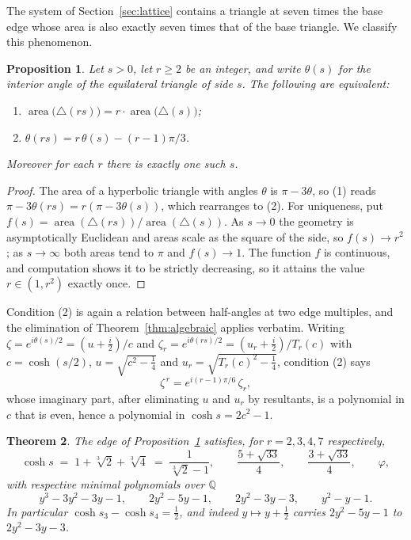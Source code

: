 \documentclass[11pt,a4paper]{article}
\theoremstyle{plain}
\newtheorem{theorem}{Theorem}[section]
\newtheorem{proposition}[theorem]{Proposition}
\theoremstyle{definition}
\theoremstyle{remark}
\newcommand{\QQ}{\mathbb{Q}}
\DeclareMathOperator{\area}{area}
\begin{document}
The system of Section~\ref{sec:lattice} contains a triangle at seven times the
base edge whose area is also exactly seven times that of the base triangle. We
classify this phenomenon.

\begin{proposition}\label{prop:rcond}
Let $s>0$, let $r\ge2$ be an integer, and write $\theta(s)$ for the interior
angle of the equilateral triangle of side $s$. The following are equivalent:
\begin{enumerate}
\item $\area\bigl(\triangle(rs)\bigr)=r\cdot\area\bigl(\triangle(s)\bigr)$;
\item $\theta(rs)=r\,\theta(s)-(r-1)\pi/3$.
\end{enumerate}
Moreover for each $r$ there is exactly one such $s$.
\end{proposition}

\begin{proof}
The area of a hyperbolic triangle with angles $\theta$ is $\pi-3\theta$, so (1)
reads $\pi-3\theta(rs)=r(\pi-3\theta(s))$, which rearranges to (2). For
uniqueness, put $f(s)=\area(\triangle(rs))/\area(\triangle(s))$. As $s\to0$ the
geometry is asymptotically Euclidean and areas scale as the square of the side,
so $f(s)\to r^{2}$; as $s\to\infty$ both areas tend to $\pi$ and $f(s)\to1$. The
function $f$ is continuous, and computation shows it to be strictly decreasing,
so it attains the value $r\in(1,r^{2})$ exactly once.
\end{proof}

Condition (2) is again a relation between half-angles at two edge multiples, and
the elimination of Theorem~\ref{thm:algebraic} applies verbatim. Writing
$\zeta=e^{i\theta(s)/2}=(u+\tfrac{i}{2})/c$ and
$\zeta_r=e^{i\theta(rs)/2}=(u_r+\tfrac{i}{2})/T_r(c)$ with $c=\cosh(s/2)$,
$u=\sqrt{c^{2}-\tfrac14}$ and $u_r=\sqrt{T_r(c)^{2}-\tfrac14}$, condition (2)
says
\begin{equation}\label{eq:rcond}
  \zeta^{\,r}=e^{i(r-1)\pi/6}\,\zeta_r ,
\end{equation}
whose imaginary part, after eliminating $u$ and $u_r$ by resultants, is a
polynomial in $c$ that is even, hence a polynomial in $\cosh s=2c^{2}-1$.

\begin{theorem}\label{thm:rvalues}
The edge of Proposition~\ref{prop:rcond} satisfies, for $r=2,3,4,7$
respectively,
\[
  \cosh s\;=\;1+\sqrt[3]{2}+\sqrt[3]{4}\;=\;\frac{1}{\sqrt[3]{2}-1},
  \qquad \frac{5+\sqrt{33}}{4},
  \qquad \frac{3+\sqrt{33}}{4},
  \qquad \varphi,
\]
with respective minimal polynomials over $\QQ$
\[
  y^{3}-3y^{2}-3y-1,\qquad 2y^{2}-5y-1,\qquad 2y^{2}-3y-3,\qquad y^{2}-y-1 .
\]
In particular $\cosh s_{3}-\cosh s_{4}=\tfrac12$, and indeed
$y\mapsto y+\tfrac12$ carries $2y^{2}-5y-1$ to $2y^{2}-3y-3$.
\end{theorem}
\end{document}

